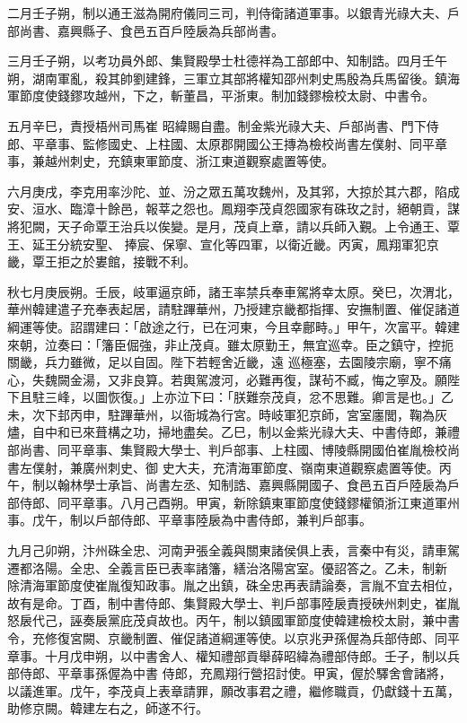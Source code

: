 \begin{pinyinscope}
 二月壬子朔，制以通王滋為開府儀同三司，判侍衛諸道軍事。以銀青光祿大夫、戶部尚書、嘉興縣子、食邑五百戶陸扆為兵部尚書。



 三月壬子朔，以考功員外郎、集賢殿學士杜德祥為工部郎中、知制誥。四月壬午朔，湖南軍亂，殺其帥劉建鋒，三軍立其部將權知邵州刺史馬殷為兵馬留後。鎮海軍節度使錢鏐攻越州，下之，斬董昌，平浙東。制加錢鏐檢校太尉、中書令。



 五月辛巳，責授梧州司馬崔
 昭緯賜自盡。制金紫光祿大夫、戶部尚書、門下侍郎、平章事、監修國史、上柱國、太原郡開國公王摶為檢校尚書左僕射、同平章事，兼越州刺史，充鎮東軍節度、浙江東道觀察處置等使。



 六月庚戌，李克用率沙陀、並、汾之眾五萬攻魏州，及其郛，大掠於其六郡，陷成安、洹水、臨漳十餘邑，報莘之怨也。鳳翔李茂貞怨國家有硃玫之討，絕朝貢，謀將犯闕，天子命覃王治兵以俟變。是月，茂貞上章，請以兵師入覲。上令通王、覃王、延王分統安聖、
 捧宸、保寧、宣化等四軍，以衛近畿。丙寅，鳳翔軍犯京畿，覃王拒之於婁館，接戰不利。



 秋七月庚辰朔。壬辰，岐軍逼京師，諸王率禁兵奉車駕將幸太原。癸巳，次渭北，華州韓建遣子充奉表起居，請駐蹕華州，乃授建京畿都指揮、安撫制置、催促諸道綱運等使。詔謂建曰：「啟途之行，已在河東，今且幸鄜畤。」甲午，次富平。韓建來朝，泣奏曰：「籓臣倔強，非止茂貞。雖太原勤王，無宜巡幸。臣之鎮守，控扼關畿，兵力雖微，足以自固。陛下若輕舍近畿，遠
 巡極塞，去園陵宗廟，寧不痛心，失魏闕金湯，又非良算。若輿駕渡河，必難再復，謀茍不臧，悔之寧及。願陛下且駐三峰，以圖恢復。」上亦泣下曰：「朕難奈茂貞，忿不思難。卿言是也。」乙未，次下邽丙申，駐蹕華州，以衙城為行宮。時岐軍犯京師，宮室廛閭，鞠為灰燼，自中和已來葺構之功，掃地盡矣。乙巳，制以金紫光祿大夫、中書侍郎，兼禮部尚書、同平章事、集賢殿大學士、判戶部事、上柱國、博陵縣開國伯崔胤檢校尚書左僕射，兼廣州刺史、御
 史大夫，充清海軍節度、嶺南東道觀察處置等使。丙午，制以翰林學士承旨、尚書左丞、知制誥、嘉興縣開國子、食邑五百戶陸扆為戶部侍郎、同平章事。八月己酉朔。甲寅，新除鎮東軍節度使錢鏐權領浙江東道軍州事。戊午，制以戶部侍郎、平章事陸扆為中書侍郎，兼判戶部事。



 九月己卯朔，汴州硃全忠、河南尹張全義與關東諸侯俱上表，言秦中有災，請車駕遷都洛陽。全忠、全義言臣已表率諸籓，繕治洛陽宮室。優詔答之。乙未，制新
 除清海軍節度使崔胤復知政事。胤之出鎮，硃全忠再表請論奏，言胤不宜去相位，故有是命。丁酉，制中書侍郎、集賢殿大學士、判戶部事陸扆責授硤州刺史，崔胤怒扆代己，誣奏扆黨庇茂貞故也。丙午，制以鎮國軍節度使韓建檢校太尉，兼中書令，充修復宮闕、京畿制置、催促諸道綱運等使。以京兆尹孫偓為兵部侍郎、同平章事。十月戊申朔，以中書舍人、權知禮部貢舉薛昭緯為禮部侍郎。壬子，制以兵部侍郎、平章事孫偓為中書
 侍郎，充鳳翔行營招討使。甲寅，偓於驛舍會諸將，以議進軍。戊午，李茂貞上表章請罪，願改事君之禮，繼修職貢，仍獻錢十五萬，助修京闕。韓建左右之，師遂不行。




\end{pinyinscope}
